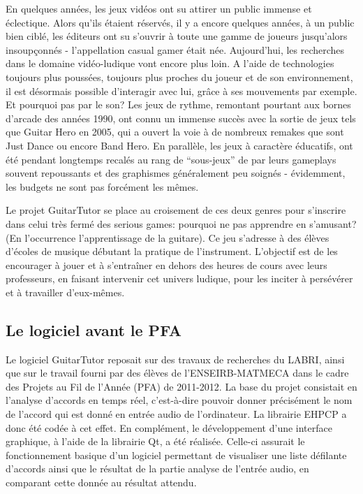 \documentclass[a4paper,11pt]{article}
\begin{document}
En quelques années, les jeux vidéos ont su attirer un public immense et éclectique. Alors qu'ils étaient réservés, il y a encore quelques années, à un public bien ciblé, les éditeurs ont su s'ouvrir à toute une gamme de joueurs jusqu'alors insoupçonnés - l'appellation casual gamer était née. Aujourd'hui, les recherches dans le domaine vidéo-ludique vont encore plus loin. A l'aide de technologies toujours plus poussées, toujours plus proches du joueur et de son environnement, il est désormais possible d'interagir avec lui, grâce à ses mouvements par exemple. Et pourquoi pas par le son? Les jeux de rythme, remontant pourtant aux bornes d'arcade des années 1990, ont connu un immense succès avec la sortie de jeux tels que Guitar Hero en 2005, qui a ouvert la voie à de nombreux remakes que sont Just Dance ou encore Band Hero. En parallèle, les jeux à caractère éducatifs, ont été pendant longtemps recalés au rang de “sous-jeux” de par leurs gameplays souvent repoussants et des graphismes généralement peu soignés - 
évidemment, les budgets ne sont pas forcément les mêmes.

Le projet GuitarTutor se place au croisement de ces deux genres pour s'inscrire dans celui très fermé des serious games: pourquoi ne pas apprendre en s'amusant? (En l'occurrence l'apprentissage de la guitare). Ce jeu s'adresse à des élèves d'écoles de musique débutant la pratique de l'instrument. L'objectif est de les encourager à jouer et à s'entraîner en dehors des heures de cours avec leurs professeurs, en faisant intervenir cet univers ludique, pour les inciter à persévérer et à travailler d'eux-mêmes.

\subsection*{Le logiciel avant le PFA}

Le logiciel GuitarTutor reposait sur des travaux de recherches du LABRI, ainsi que sur le travail fourni par des élèves de l'ENSEIRB-MATMECA dans le cadre des Projets au Fil de l'Année (PFA) de 2011-2012. La base du projet consistait en l'analyse d'accords en temps réel, c'est-à-dire pouvoir donner précisément le nom de l'accord qui est donné en entrée audio de l'ordinateur. La librairie EHPCP a donc été codée à cet effet. En complément, le développement d'une interface graphique, à l'aide de la librairie Qt, a été réalisée. Celle-ci assurait le fonctionnement basique d'un logiciel permettant de visualiser une liste défilante d'accords ainsi que le résultat de la partie analyse de l'entrée audio, en comparant cette donnée au résultat attendu.
\end{document}
